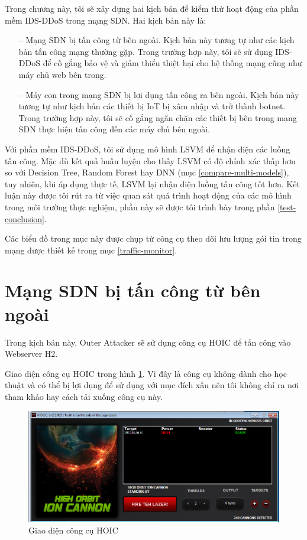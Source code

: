 Trong chương này, tôi sẽ xây dựng hai kịch bản để kiểm thử hoạt động của phần mềm  IDS-DDoS trong mạng SDN. Hai kịch bản này là:

\begin{itemize}
	\item [--] Mạng SDN bị tấn công từ bên ngoài. Kịch bản này tương tự như các kịch bản tấn công mạng thường gặp. Trong trường hợp này, tôi sẽ sử dụng IDS-DDoS để cố gắng bảo vệ và giảm thiểu thiệt hại cho hệ thống mạng cũng như máy chủ web bên trong.
	\item [--] Máy con trong mạng SDN bị lợi dụng tấn công ra bên ngoài. Kịch bản này tương tự như kịch bản các thiết bị IoT bị xâm nhập và trở thành botnet. Trong trường hợp này, tôi sẽ cố gắng ngăn chặn các thiết bị bên trong mạng SDN thực hiện tấn công đến các máy chủ bên ngoài.
\end{itemize}

Với phần  mềm IDS-DDoS, tôi sử dụng mô hình LSVM để nhận diện các luồng tấn công. Mặc dù kết quả huấn luyện cho thấy LSVM có độ chính xác thấp hơn so với Decision Tree, Random Forest hay DNN (mục \ref{compare-multi-models}), tuy nhiên, khi áp dụng thực tế, LSVM lại nhận diện luồng tấn công tốt hơn. Kết luận này được tôi rút ra từ việc quan sát quá trình hoạt động của các mô hình trong môi trường thực nghiệm, phần này sẽ được tôi trình bày trong phần \ref{test-conclusion}.

Các biểu đồ trong mục này được chụp từ công cụ theo dõi lưu lượng gói tin trong mạng được thiết kế trong mục \ref{traffic-monitor}.

\section{Mạng SDN bị tấn công từ bên ngoài}
\label{c:6.1}

Trong kịch bản này, Outer Attacker sẽ sử dụng công cụ HOIC để tấn công vào Webserver H2.

Giao diện công cụ HOIC trong hình \ref{fig:hoic}. Vì đây là công cụ không dành cho học thuật và có thể bị lợi dụng để sử dụng với mục đích xấu  nên tôi không chỉ ra nơi tham khảo hay cách tải xuống công cụ này.

\begin{figure}[ht!]
	\centering
	\includegraphics[width=0.75\linewidth]{fig/hoic.png}
	\caption{Giao diện công cụ HOIC}
	\label{fig:hoic}
\end{figure}

